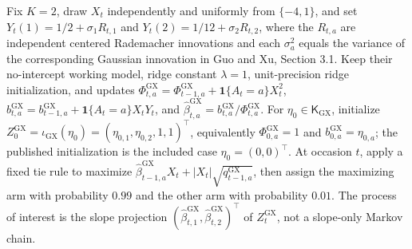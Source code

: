 Fix \(K=2\), draw \(X_t\) independently and uniformly from \(\{-4,1\}\), and set \(Y_t(1)=1/2+\sigma_1R_{t,1}\) and \(Y_t(2)=1/12+\sigma_2R_{t,2}\), where the \(R_{t,a}\) are independent centered Rademacher innovations and each \(\sigma_a^2\) equals the variance of the corresponding Gaussian innovation in Guo and Xu, Section 3.1. Keep their no-intercept working model, ridge constant \(\lambda=1\), unit-precision ridge initialization, and updates \(\Phi^{\mathrm{GX}}_{t,a}=\Phi^{\mathrm{GX}}_{t-1,a}+\mathbf 1\{A_t=a\}X_t^2\), \(b^{\mathrm{GX}}_{t,a}=b^{\mathrm{GX}}_{t-1,a}+\mathbf 1\{A_t=a\}X_tY_t\), and \(\widehat\beta^{\mathrm{GX}}_{t,a}=b^{\mathrm{GX}}_{t,a}/\Phi^{\mathrm{GX}}_{t,a}\). For \(\eta_0\in\mathsf K_{\mathrm{GX}}\), initialize \(Z^{\mathrm{GX}}_0=\iota_{\mathrm{GX}}(\eta_0)=(\eta_{0,1},\eta_{0,2},1,1)^\top\), equivalently \(\Phi^{\mathrm{GX}}_{0,a}=1\) and \(b^{\mathrm{GX}}_{0,a}=\eta_{0,a}\); the published initialization is the included case \(\eta_0=(0,0)^\top\). At occasion \(t\), apply a fixed tie rule to maximize \(\widehat\beta^{\mathrm{GX}}_{t-1,a}X_t+|X_t|\sqrt{q^{\mathrm{GX}}_{t-1,a}}\), then assign the maximizing arm with probability \(0.99\) and the other arm with probability \(0.01\). The process of interest is the slope projection \((\widehat\beta^{\mathrm{GX}}_{t,1},\widehat\beta^{\mathrm{GX}}_{t,2})^\top\) of \(Z^{\mathrm{GX}}_t\), not a slope-only Markov chain.